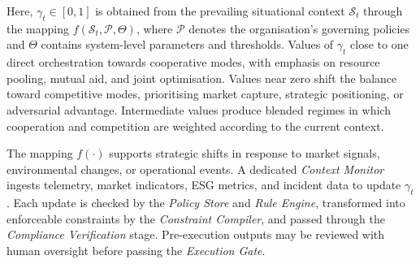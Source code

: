 \documentclass[oneside,10pt]{swissi}
\begin{document}
Here, $\gamma_t \in [0,1]$ is obtained from the prevailing situational context $\mathcal{S}_t$ through the mapping
$f(\mathcal{S}_t, \mathcal{P}, \Theta)$, where $\mathcal{P}$ denotes the organisation’s governing policies and
$\Theta$ contains system-level parameters and thresholds. Values of $\gamma_t$ close to one direct orchestration
towards cooperative modes, with emphasis on resource pooling, mutual aid, and joint optimisation. Values near zero
shift the balance toward competitive modes, prioritising market capture, strategic positioning, or adversarial
advantage. Intermediate values produce blended regimes in which cooperation and competition are weighted according
to the current context.

The mapping $f(\cdot)$ supports strategic shifts in response to market signals, environmental changes, or operational
events. A dedicated \emph{Context Monitor} ingests telemetry, market indicators, ESG metrics, and incident data to
update $\gamma_t$. Each update is checked by the \emph{Policy Store} and \emph{Rule Engine}, transformed into
enforceable constraints by the \emph{Constraint Compiler}, and passed through the \emph{Compliance Verification}
stage. Pre-execution outputs may be reviewed with human oversight before passing the \emph{Execution Gate}.
\end{document}

